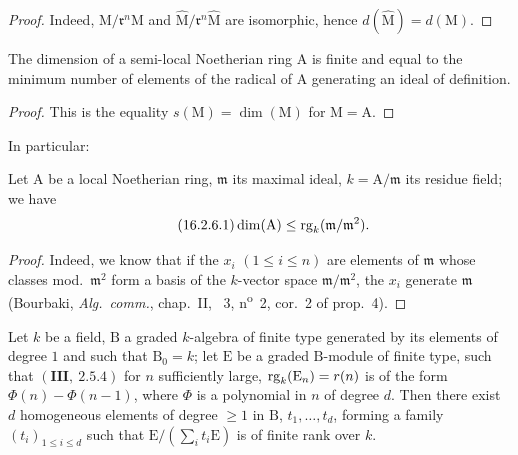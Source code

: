 
\begin{proof}
Indeed, $\mathrm{M}/\mathfrak{r}^n\mathrm{M}$ and $\widehat{\mathrm{M}}/\mathfrak{r}^n\widehat{\mathrm{M}}$ are isomorphic, hence $d(\widehat{\mathrm{M}})=d(\mathrm{M})$.
\end{proof}

\begin{corollary}[16.2.5]
\label{0.16.2.5}
The dimension of a semi-local Noetherian ring $\mathrm{A}$ is finite and equal to the minimum number of elements of the radical of $\mathrm{A}$ generating an ideal of definition.
\end{corollary}

\begin{proof}
This is the equality $s(\mathrm{M})=\dim(\mathrm{M})$ for $\mathrm{M}=\mathrm{A}$.
\end{proof}

In particular:

\begin{corollary}[16.2.6]
\label{0.16.2.6}
Let $\mathrm{A}$ be a local Noetherian ring, $\mathfrak{m}$ its maximal ideal, $k=\mathrm{A}/\mathfrak{m}$ its residue field; we have
\begin{equation}
\label{0.16.2.6.1}
\tag{16.2.6.1}
  \dim(\mathrm{A})\leq\operatorname{rg}_k(\mathfrak{m}/\mathfrak{m}^2).
\end{equation}
\end{corollary}

\begin{proof}
Indeed, we know that if the $x_i$ $(1\leq i\leq n)$ are elements of $\mathfrak{m}$ whose classes mod.~$\mathfrak{m}^2$ form a basis of the $k$-vector space $\mathfrak{m}/\mathfrak{m}^2$, the $x_i$ generate $\mathfrak{m}$ (Bourbaki, \emph{Alg.~comm.}, chap.~II, \textsection~3, n\textsuperscript{o}~2, cor.~2 of prop.~4).
\end{proof}

\begin{proposition}[16.2.7]
\label{0.16.2.7}
Let $k$ be a field, $\mathrm{B}$ a graded $k$-algebra of finite type generated by its elements of degree $1$ and such that $\mathrm{B}_0=k$; let $\mathrm{E}$ be a graded $\mathrm{B}$-module of finite type, such that $(\mathbf{III},~2.5.4)$ for $n$ sufficiently large, $\operatorname{rg}_k(\mathrm{E}_n)=r(n)$ is of the form $\Phi(n)-\Phi(n-1)$, where $\Phi$ is a polynomial in $n$ of degree $d$.
Then there exist $d$ homogeneous elements of degree $\geq 1$ in $\mathrm{B}$, $t_1,\ldots,t_d$, forming a family $(t_i)_{1\leq i\leq d}$ such that $\mathrm{E}/(\sum_i t_i\mathrm{E})$ is of finite rank over $k$.
\end{proposition}

